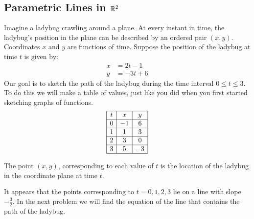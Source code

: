 \documentclass{ximera}
\begin{document}
\subsection*{Parametric Lines in $\mathbb{R}^2$}
\begin{exploration}\label{init:paramline2d}
Imagine a ladybug crawling around a plane.  At every instant in time, the ladybug's position in the plane can be described by an ordered pair $(x, y)$.  Coordinates $x$ and $y$ are functions of time.  Suppose the position of the ladybug at time $t$ is given by:
\begin{align*}
x&=2t-1\\
y&=-3t+6
\end{align*}
Our goal is to sketch the path of the ladybug during the time interval $0\leq t\leq 3$.  To do this we will make a table of values, just like you did when you first started sketching graphs of functions.
$$\begin{array}{|c|c|c|} 
 \hline t& x & y\\
 \hline 0 & -1 & 6\\
 \hline 1 & 1 & 3 \\
 \hline 2 & 3& 0\\
 \hline 3 & 5& -3\\
 \hline
 \end{array}$$
  
The point $(x, y)$, corresponding to each value of $t$ is the location of the ladybug in the coordinate plane at time $t$.
 \begin{center}
\end{center}
 
It appears that the points corresponding to $t=0, 1, 2, 3$ lie on a line with slope $-\frac{3}{2}$.  In the next problem we will find the equation of the line that contains the path of the ladybug.
\end{exploration}
 
\end{document}
